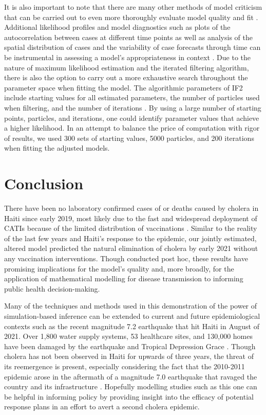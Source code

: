 \documentclass[12pt]{article}
\begin{document}
   It is also important to note that there are many other methods of model criticism that can be carried out to even more thoroughly evaluate model quality and fit \cite{Millar, Cole}. Additional likelihood profiles and model diagnostics such as plots of the autocorrelation between cases at different time points as well as analysis of the spatial distribution of cases and the variability of case forecasts through time can be instrumental in assessing a model's appropriateness in context \cite{King_av}. Due to the nature of maximum likelihood estimation and the iterated filtering algorithm, there is also the option to carry out a more exhaustive search throughout the parameter space when fitting the model. The algorithmic parameters of IF2 include starting values for all estimated parameters, the number of particles used when filtering, and the number of iterations \cite{Ionides_infpomp}. By using a large number of starting points, particles, and iterations, one could identify parameter values that achieve a higher likelihood. In an attempt to balance the price of computation with rigor of results, we used 300 sets of starting values, 5000 particles, and 200 iterations when fitting the adjusted models.

\section{Conclusion}

  There have been no laboratory confirmed cases of or deaths caused by cholera in Haiti since early 2019, most likely due to the fast and widespread deployment of CATIs because of the limited distribution of vaccinations \cite{Rebaudet}. Similar to the reality of the last few years and Haiti's response to the epidemic, our jointly estimated, altered model predicted the natural elimination of cholera by early 2021 without any vaccination interventions. Though conducted post hoc, these results have promising implications for the model's quality and, more broadly, for the application of mathematical modelling for disease transmission to informing public health decision-making.

  Many of the techniques and methods used in this demonstration of the power of simulation\hyp{}based inference can be extended to current and future epidemiological contexts such as the recent magnitude 7.2 earthquake that hit Haiti in August of 2021. Over 1,800 water supply systems, 53 healthcare sites, and 130,000 homes have been damaged by the earthquake and Tropical Depression Grace \cite{uni}. Though cholera has not been observed in Haiti for upwards of three years, the threat of its reemergence is present, especially considering the fact that the 2010-2011 epidemic arose in the aftermath of a magnitude 7.0 earthquake that ravaged the country and its infrastructure \cite{Sanon}. Hopefully modelling studies such as this one can be helpful in informing policy by providing insight into the efficacy of potential response plans in an effort to avert a second cholera epidemic.
\end{document}
